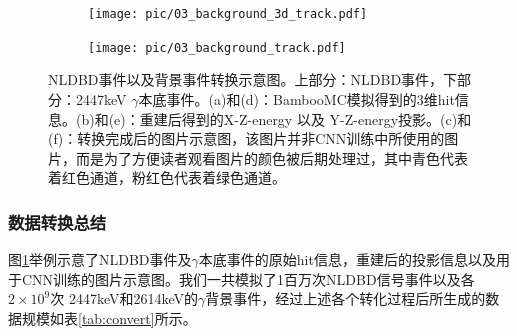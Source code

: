 \begin{figure}
        \begin{subfigure}[t]{0.22\textwidth}
          \centering
          \texttt{[image: pic/03\_background\_3d\_track.pdf]}
          \caption{}
        \end{subfigure}
        \begin{subfigure}[t]{0.44\textwidth}
          \centering
          \texttt{[image: pic/03\_background\_track.pdf]}
          \caption{}
        \end{subfigure}
        \begin{subfigure}[t]{0.16\textwidth}
          \centering
          \setlength{\fboxsep}{0pt}
          \caption{}
        \end{subfigure}
        
        \caption{NLDBD事件以及背景事件转换示意图。上部分：\xeots NLDBD事件，下部分：2447keV $\gamma$本底事件。(a)和(d)：BambooMC模拟得到的3维hit信息。(b)和(e)：重建后得到的X-Z-energy 以及 Y-Z-energy投影。(c)和(f)：转换完成后的图片示意图，该图片并非CNN训练中所使用的图片，而是为了方便读者观看图片的颜色被后期处理过，其中青色代表着红色通道，粉红色代表着绿色通道。}
        \label{fig:image_mapping}
        \end{figure}

        
\subsubsection{数据转换总结}
图\ref{fig:image_mapping}举例示意了NLDBD事件及$\gamma$本底事件的原始hit信息，重建后的投影信息以及用于CNN训练的图片示意图。我们一共模拟了1百万次NLDBD信号事件以及各$2\times10^9$次
2447keV和2614keV的$\gamma$背景事件，经过上述各个转化过程后所生成的数据规模如表\ref{tab:convert}所示。

